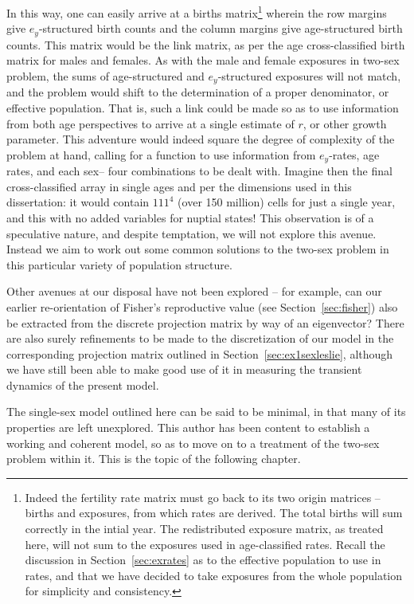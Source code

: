 In this
way, one can easily arrive at a births matrix\footnote{Indeed the fertility rate
matrix must go back to its two origin matrices -- births and exposures, from
which rates are derived. The total births will sum correctly in the intial
year. The redistributed exposure matrix, as treated here, will not sum to
the exposures used in age-classified rates. Recall the discussion in
Section~\ref{sec:exrates} as to the effective population to use in rates, and
that we have decided to take exposures from the whole population for simplicity
and consistency.} wherein the row margins give $e_y$-structured birth counts and
the column margins give age-structured birth counts. This matrix would be
the link matrix, as per the age cross-classified birth matrix for males and
females. As with the male and female exposures in two-sex problem, the sums 
of age-structured and
$e_y$-structured exposures will not match, and the problem would shift to the 
determination of a proper denominator, or effective population. That is, such a
link could be made so as to use information from both age perspectives to arrive
at a single estimate of $r$, or other growth parameter. This adventure would
indeed square the degree of complexity of the problem at hand, calling
for a function to use information from $e_y$-rates, age rates, and each sex-- four
combinations to be dealt with. Imagine then the final cross-classified array
in single ages and per the dimensions used in this dissertation: it would
contain $111^4$ (over 150 million) cells for just a single year, and this with
no added variables for nuptial states! This observation is of a speculative nature, and despite
temptation, we will not explore this avenue. Instead we aim to work out some 
common solutions to the two-sex problem in this particular variety of population structure.

Other avenues at our disposal have not been explored -- for example, can our
earlier re-orientation of Fisher's reproductive value (see
Section~\ref{sec:fisher}) also be extracted from the discrete projection
matrix by way of an eigenvector? There are also surely refinements to be made to the discretization of our model
in the corresponding projection matrix outlined in
Section~\ref{sec:ex1sexleslie}, although we have still been able to make good
use of it in measuring the transient dynamics of the present model.

The single-sex model outlined here can be said to be minimal, in that many of
its properties are left unexplored. This author has been content to establish a
working and coherent model, so as to move on to a treatment of the two-sex
problem within it. This is the topic of the following chapter.
